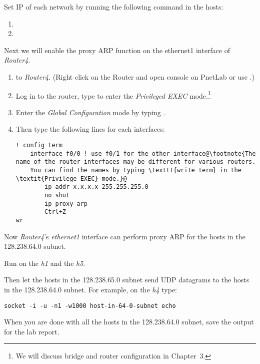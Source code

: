 \documentclass{../UTNetLab}
\begin{document}
Set IP of each network by running the following command in the hosts:
\begin{enumerate}
    \item {}
    \item {}
\end{enumerate}
Next we will enable the proxy ARP function on the ethernet1 interface of \textit{Router4}.
\begin{enumerate}
    \item {} to \textit{Router4}.
          (Right click on the Router and open console on PnetLab or use .)
    \item Log in to the router, type  to enter the \textit{Privileged EXEC} mode.\footnote{We will discuss bridge and router configuration in Chapter~3.}
    \item Enter the \textit{Global Configuration} mode by typing .
    \item Then type the following lines for each interfaces:
          \begin{lstlisting}[language={cisco}, escapechar={@}, emph={x}]
! config term
    interface f0/0 ! use f0/1 for the other interface@\footnote{The name of the router interfaces may be different for various routers.
    You can find the names by typing \texttt{write term} in the \textit{Privilege EXEC} mode.}@
        ip addr x.x.x.x 255.255.255.0
        no shut
        ip proxy-arp
        Ctrl+Z
wr
        \end{lstlisting}
\end{enumerate}

Now \textit{Router4}’s \textit{ethernet1} interface can perform proxy ARP for the hosts in the 128.238.64.0 subnet.

Run  on the \textit{h1} and the \textit{h5}.

Then let the hosts in the 128.238.65.0 subnet send UDP datagrams to the hosts in the 128.238.64.0 subnet.
For example, on the \textit{h4} type:
\begin{lstlisting}[emph={host-in-64-0-subnet},morekeywords={[3]echo}]
socket -i -u -n1 -w1000 host-in-64-0-subnet echo
    \end{lstlisting}

When you are done with all the hosts in the 128.238.64.0 subnet, save the  output for the lab report.
\end{document}
